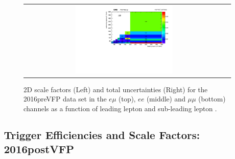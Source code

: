 \begin{figure}[h]
\begin{center}
\begin{tabular}{cc}
      \includegraphics[width=0.50\textwidth]{fig_2016preVFP_TrigSF/h2D_lepABpt_mumu_BinErrors.pdf}\\
    \end{tabular}
    \caption{2D scale factors (Left) and total uncertainties (Right) for the 2016preVFP data set in the $e\mu$ (top), $ee$ (middle) and $\mu\mu$ (bottom) channels as a function of leading lepton \pT and sub-leading lepton \pT.}
    \label{TrigSF_2016preVFP_4}
  \end{center}
\end{figure}

\clearpage
\subsection{Trigger Efficiencies and Scale Factors: 2016postVFP}
\label{TrigSFResults2016postVFP}

